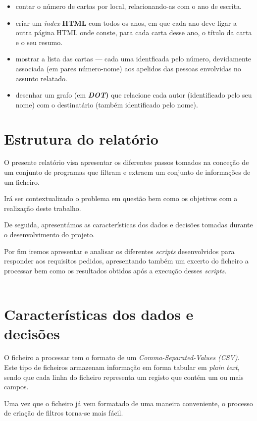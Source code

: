 \documentclass[11pt,a4paper]{report}
\begin{document}
    \begin{itemize}
        \item contar o número de cartas por local, relacionando-as com o ano de escrita.
        \item criar um \textit{index} \textbf{HTML} com todos os anos, em que cada ano deve ligar a outra página HTML onde conste, para cada carta desse ano, o título da carta e o seu resumo.
        \item mostrar a lista das cartas — cada uma identficada pelo número, devidamente associada (em pares número-nome) aos apelidos das pessoas envolvidas no assunto relatado.
        \item desenhar um grafo (em \textbf{\textit{DOT})} que relacione cada autor (identificado pelo seu nome) com o destinatário (também identificado pelo nome).
    \end{itemize}

\section{Estrutura do relatório}

    \qquad O presente relatório visa apresentar os diferentes passos tomados na conceção de um conjunto de programas que filtram e extraem um conjunto de informações de um ficheiro.
    
    \quad Irá ser contextualizado o problema em questão bem como os objetivos com a realização deste trabalho.
    
    \quad De seguida, apresentámos as características dos dados e decisões tomadas durante o desenvolvimento do projeto. 
    
    \quad Por fim iremos apresentar e analisar os diferentes \textit{scripts} desenvolvidos para responder aos requisitos pedidos, apresentando também um excerto do ficheiro a processar bem como os resultados obtidos após a execução desses \textit{scripts}.
\\
\\
\section{Características dos dados e decisões}
    \qquad O ficheiro a processar tem o formato de um \textit{Comma-Separated-Values (CSV)}. Este tipo de ficheiros armazenam informação em forma tabular em \textit{plain text}, sendo que cada linha do ficheiro representa um registo que contém um ou mais campos.
    
    \qquad Uma vez que o ficheiro já vem formatado de uma maneira conveniente, o processo de criação de filtros torna-se mais fácil.
    
\end{document}
